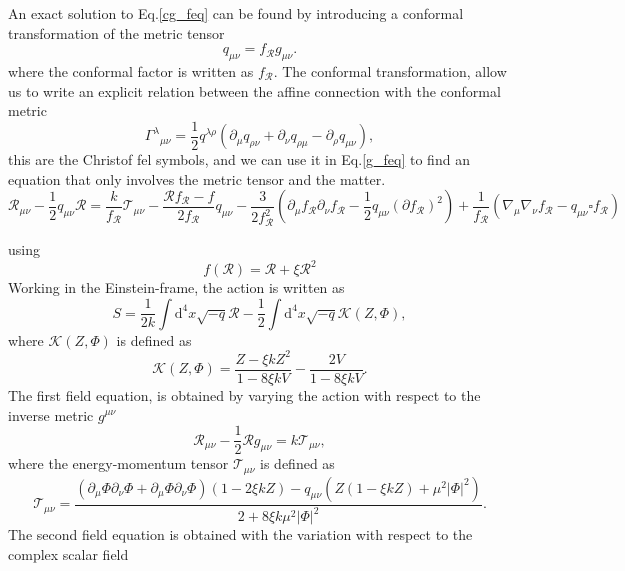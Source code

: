 \documentclass{article}
\begin{document}
An exact solution to Eq.\eqref{cg_feq} can be found by introducing a conformal transformation
of the metric tensor
\begin{equation}
    q_{\mu\nu} = f_{\mathcal{R}}g_{\mu\nu}.
\end{equation}
where the conformal factor is written as $f_{\mathcal{R}}$. The conformal transformation, allow us
to write an explicit relation between the affine connection with the conformal metric
\begin{equation}
    \Gamma^{\lambda}{}_{\mu\nu} = \frac{1}{2}q^{\lambda\rho}\left(\partial_\mu q_{\rho\nu} + 
    \partial_\nu q_{\rho\mu} - \partial_\rho q_{\mu\nu}\right),
\end{equation}
this are the Christof fel symbols, and we can use it in Eq.\eqref{g_feq} to find an equation
that only involves the metric tensor and the matter.
\begin{equation}
    \mathcal{R}_{\mu\nu} - \frac{1}{2}q_{\mu\nu}\mathcal{R} = \frac{k}{f_{\mathcal{R}}}\mathcal{T}_{\mu\nu}
    - \frac{\mathcal{R}f_{\mathcal{R}} - f}{2f_{\mathcal{R}}}q_{\mu\nu} - \frac{3}{2f^2_{\mathcal{R}}}
    \left(\partial_\mu f_{\mathcal{R}} \partial_\nu f_{\mathcal{R}} - \frac{1}{2}q_{\mu\nu}(\partial f_{\mathcal{R}})^2\right)
    + \frac{1}{f_{\mathcal{R}}}\left(\nabla_\mu\nabla_\nu f_{\mathcal{R}} - q_{\mu\nu}\square f_{\mathcal{R}}\right)
\end{equation}

using
\begin{equation}
    f(\mathcal{R}) = \mathcal{R} + \xi \mathcal{R}^2
\end{equation}
Working in the Einstein-frame, the action is written as
\begin{equation}
    S = \frac{1}{2k}\int \mathrm{d}^4x \sqrt{-q}\mathcal{R} - \frac{1}{2}\int \mathrm{d}^4x \sqrt{-q}\mathcal{K}(Z,\Phi),
\end{equation}
where $\mathcal{K}(Z,\Phi)$ is defined as
\begin{equation}
    \mathcal{K}(Z,\Phi) = \frac{Z - \xi k Z^2}{1 - 8\xi k V} - \frac{2V}{1 - 8\xi k V}.
\end{equation}
The first field equation, is obtained by varying the action with respect to the
inverse metric $g^{\mu\nu}$
\begin{equation}
    \mathcal{R}_{\mu\nu} - \frac{1}{2}\mathcal{R}g_{\mu\nu} = k\mathcal{T}_{\mu\nu},
    \end{equation} 
where the energy-momentum tensor $\mathcal{T}_{\mu\nu}$ is defined as
\begin{equation}
    \mathcal{T}_{\mu\nu} = \frac{\left(\partial_\mu \Phi \partial_\nu \Phi + \partial_\mu \Phi \partial_\nu \Phi \right)\left(1 - 2\xi k Z\right)
    -q_{\mu\nu}\left( Z\left(1 - \xi k Z\right) +  \mu^2\vert \Phi\vert^2\right)}{2 + 8\xi k \mu^2 \vert \Phi\vert^2}.
\end{equation}
The second field equation is obtained with the variation with respect to the complex
scalar field 
\end{document}
